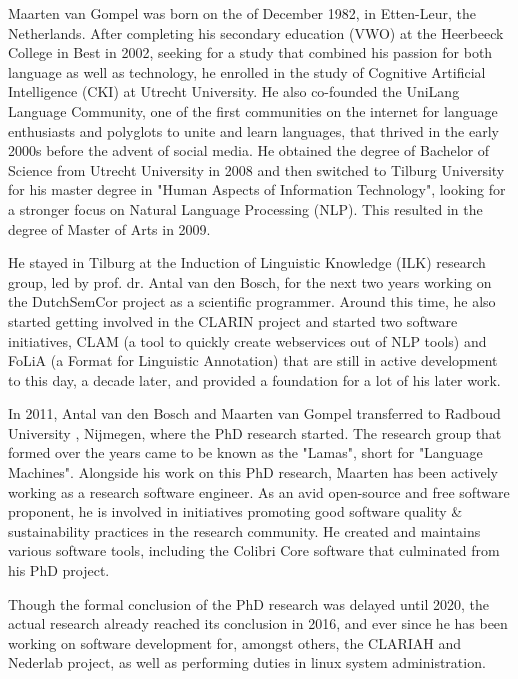 
Maarten van Gompel was born on the  of December 1982, in Etten-Leur,
the Netherlands. After completing his secondary education (VWO) at the
Heerbeeck College in Best in 2002, seeking for a study that combined his
passion for both language as well as technology, he enrolled in the study of
Cognitive Artificial Intelligence (CKI) at Utrecht University. He also
co-founded the UniLang Language Community, one of the first communities on the
internet for language enthusiasts and polyglots to unite and learn languages,
that thrived in the early 2000s before the advent of social media. He obtained
the degree of Bachelor of Science from Utrecht University in 2008 and then
switched to Tilburg University for his master degree in "Human Aspects of
Information Technology", looking for a stronger focus on Natural Language
Processing (NLP).  This resulted in the degree of Master of Arts in 2009.

He stayed in Tilburg at the Induction of Linguistic Knowledge (ILK) research
group, led by prof. dr. Antal van den Bosch, for the next two years working on
the DutchSemCor project as a scientific programmer. Around this time, he also
started getting involved in the CLARIN project and started two software
initiatives, CLAM (a tool to quickly create webservices out of NLP tools) and
FoLiA (a Format for Linguistic Annotation) that are still in active development
to this day, a decade later, and provided a foundation for a lot of his later work.

In 2011, Antal van den Bosch and Maarten van Gompel transferred to Radboud
University , Nijmegen, where the PhD research started. The research group that
formed over the years came to be known as the "Lamas", short for "Language
Machines".  Alongside his work on this PhD research, Maarten has been actively
working as a research software engineer. As an avid open-source and free
software proponent, he is involved in initiatives promoting good software
quality \& sustainability practices in the research community. He created and
maintains various software tools, including the Colibri Core software that
culminated from his PhD project.

Though the formal conclusion of the PhD research was delayed until 2020, the
actual research already reached its conclusion in 2016, and ever since he has
been working on software development for, amongst others, the CLARIAH and
Nederlab project, as well as performing duties in linux system administration.
